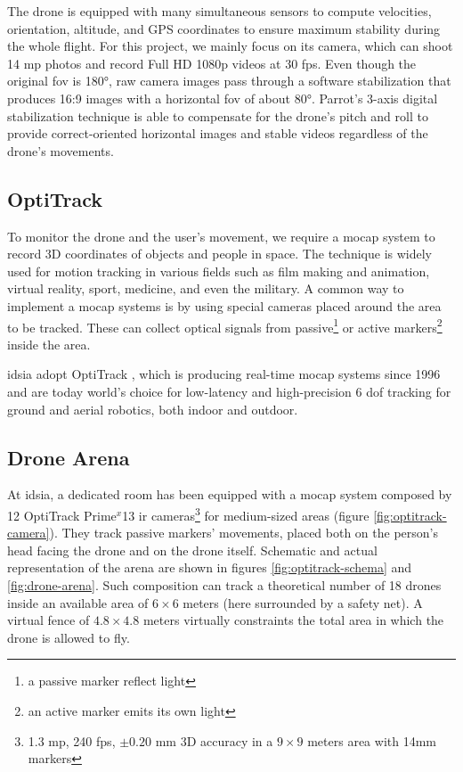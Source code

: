 The drone is equipped with many simultaneous sensors to compute velocities, orientation, altitude, and GPS coordinates to ensure maximum stability during the whole flight. For this project, we mainly focus on its camera, which can shoot 14 \gls{mp} photos and record Full HD 1080p videos at 30 \gls{fps}. Even though the original \gls{fov} is 180°, raw camera images pass through a software stabilization that produces 16:9 images with a horizontal \gls{fov} of about 80°. Parrot's 3-axis digital stabilization technique is able to compensate for the drone's pitch and roll to provide correct-oriented horizontal images and stable videos regardless of the drone's movements.



\subsection{OptiTrack}
\label{subsec:optitrack}

To monitor the drone and the user's movement, we require a \gls{mocap} system to record 3D coordinates of objects and people in space. The technique is widely used for motion tracking in various fields such as film making and animation, virtual reality, sport, medicine, and even the military. A common way to implement a \gls{mocap} systems is by using special cameras placed around the area to be tracked. These can collect optical signals from passive\footnote{a passive marker reflect light} or active markers\footnote{an active marker emits its own light} inside the area.

\medskip

\gls{idsia} adopt OptiTrack \cite{optitrack}, which is producing real-time \gls{mocap} systems since 1996 and are today world’s choice for low-latency and high-precision 6 \gls{dof} tracking for ground and aerial robotics, both indoor and outdoor.



\subsection{Drone Arena}
\label{subsec:drone-arena}

At \gls{idsia}, a dedicated room has been equipped with a \gls{mocap} system composed by 12 OptiTrack Prime$^x$13 \gls{ir} cameras\footnote{1.3 \gls{mp}, 240 \gls{fps}, $\pm0.20$ mm 3D accuracy in a $9 \times 9$ meters area with 14mm markers} for medium-sized areas (figure \ref{fig:optitrack-camera}). They track passive markers' movements, placed both on the person's head facing the drone and on the drone itself. Schematic and actual representation of the arena are shown in figures \ref{fig:optitrack-schema} and \ref{fig:drone-arena}. Such composition can track a theoretical number of 18 drones inside an available area of $6 \times 6$ meters (here surrounded by a safety net). A virtual fence of $4.8 \times 4.8$ meters virtually constraints the total area in which the drone is allowed to fly.


